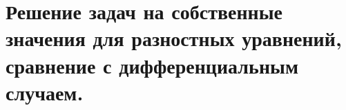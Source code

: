 \section{Решение задач на собственные значения для разностных уравнений, сравнение с дифференциальным случаем.}
